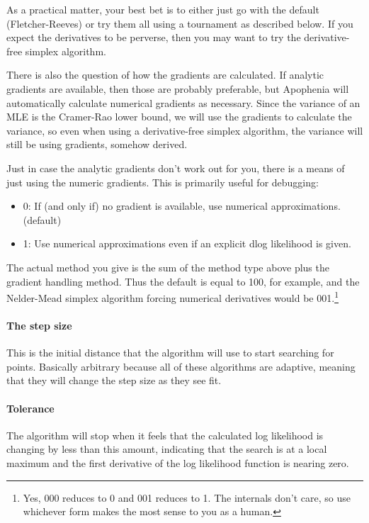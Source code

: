 As a practical matter, your best bet is to either just go with the default (Fletcher-Reeves) or try them all using a tournament as described below. 
If you expect the derivatives to be perverse, then you may want to try the derivative-free simplex algorithm.

There is also the question of how the gradients are calculated. If
analytic gradients are available, then those are probably preferable, but
Apophenia will automatically calculate numerical gradients as necessary.
Since the variance of an MLE is the Cramer-Rao lower bound, we will use
the gradients to calculate the variance, so even when using a
derivative-free simplex algorithm, the variance will still be using
gradients, somehow derived.

Just in case the analytic gradients don't work out for you, there is a
means of just using the numeric gradients. This is primarily useful for debugging:

\begin{itemize}
\item 0: If (and only if) no gradient is available, use numerical approximations.  (default)
\item 1: Use numerical approximations even if an explicit dlog likelihood is given. 
\end{itemize}

The actual method you give is the sum of the method type above plus the
gradient handling method. Thus the default is equal to 100, for example, and the
Nelder-Mead simplex algorithm forcing numerical derivatives would be
001.\footnote{Yes, 000 reduces to 0 and 001 reduces to 1. The internals
don't care, so use whichever form makes the most sense to you as a human.}


\paragraph{The step size} This is the initial distance that the
algorithm will use to start searching for points. Basically arbitrary
because all of these algorithms are adaptive, meaning that they will
change the step size as they see fit.

\paragraph{Tolerance} The algorithm will stop when it feels
that the calculated log likelihood is changing by less than this amount,
indicating that the search is at a local maximum and the first derivative of
the log likelihood function is nearing zero.

